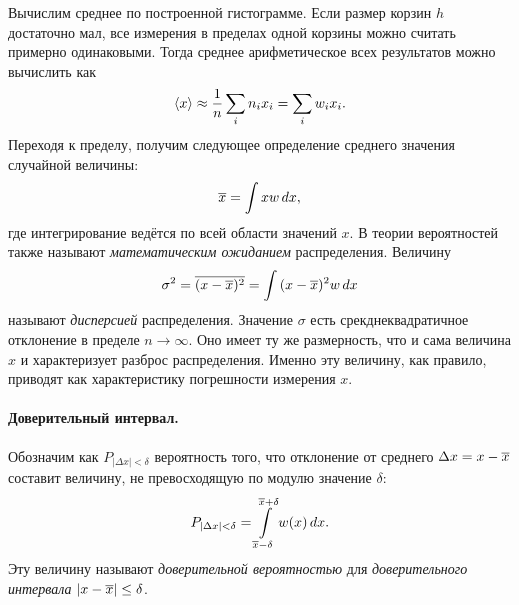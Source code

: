 Вычислим среднее по построенной гистограмме. Если размер корзин
$h$ достаточно мал, все измерения в пределах одной корзины можно считать примерно
одинаковыми. Тогда среднее арифметическое всех результатов можно вычислить как
\[
\left<x\right> \approx \frac{1}{n}\sum_i n_i x_i = \sum_i w_i x_i.
\]
Переходя к пределу, получим следующее определение среднего значения
случайной величины:
\begin{equation}
    \overline{x} = \int{x w\,dx},
\end{equation}
где интегрирование ведётся по всей области значений $x$.
В теории вероятностей  также называют \emph{математическим ожиданием}
распределения.
Величину
\begin{equation}
    \sigma^2 = \overline{(x-\overline{x})^2}= \int{(x - \ensuremath{\overline{x}})^2 w\,dx}
\end{equation}
называют \emph{дисперсией} распределения. Значение $\sigma$ есть
срекднеквадратичное отклонение в пределе $n\to \infty$. Оно имеет ту
же размерность, что и сама величина $x$ и характеризует разброс распределения.
Именно эту величину, как правило, приводят как характеристику погрешности
измерения $x$.

\paragraph{Доверительный интервал.}
Обозначим как $P_{\left|\Delta x\right|<\delta}$ вероятность
того, что отклонение от среднего $\Delta x=x-\overline{x}$ составит величину,
не превосходящую по модулю значение $\delta$:
\begin{equation}\label{eq:confidenceP}
P_{\left|\Delta x\right|<\delta}=\int\limits
_{\overline{x}-\delta}^{\overline{x}+\delta}w\!\left(x\right)dx.
\end{equation}
Эту величину называют \emph{доверительной вероятностью} для
\emph{доверительного интервала} $\left|x-\overline{x}\right|\le\delta$.



